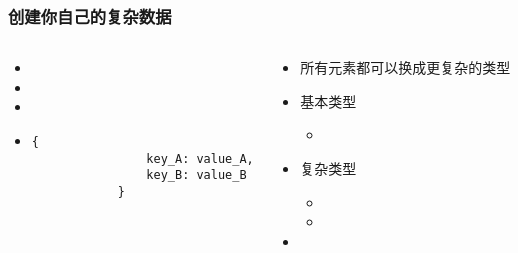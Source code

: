\begin{CJK}{UTF8}{gbsn}
\begin{frame} [fragile]
	\frametitle{创建你自己的复杂数据}
	\linespread{1.5}
	\begin{columns}[T]
		\begin{column}[T]{.5\textwidth}
			\begin{itemize}
			\item {}
			\item \inlinePython{[a, b, c]}
			\item {}
			\item
			\begin{lstlisting}[style=pythonstyle, gobble=12]
			{
				key_A: value_A,
				key_B: value_B
			}
			\end{lstlisting}
			\end{itemize}
		\end{column}
		\begin{column}[T]{.5\textwidth}
			\begin{itemize}
			\item 所有元素都可以换成更复杂的类型
			\item 基本类型
				\begin{itemize}
				\item {}
				\end{itemize}
			\item 复杂类型
				\begin{itemize}
				\item {}
				\item {}
				\end{itemize}
			\item {}
			\end{itemize}
		\end{column}
	\end{columns}
\end{frame}


\end{CJK}
